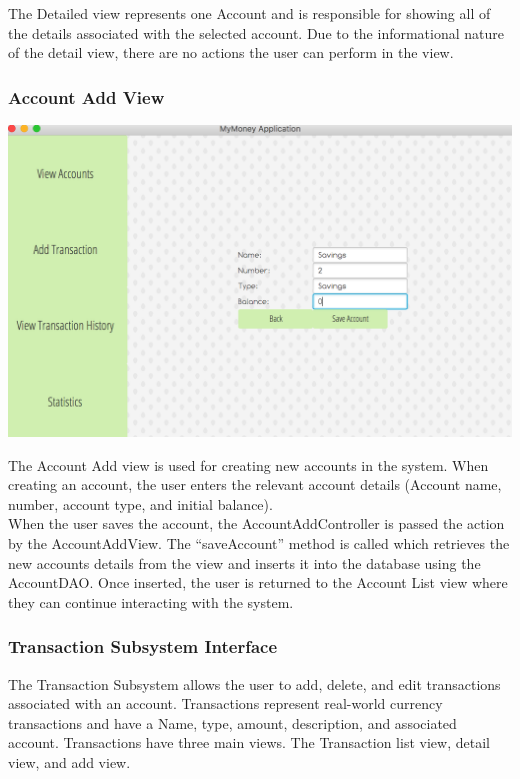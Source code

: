 \documentclass[12pt]{article}
\begin{document}
The Detailed view represents one Account and is responsible for
showing all of the details associated with the selected account. 
Due to the informational nature of the detail view, there are no actions
the user can perform in the view.

\subsubsection{Account Add View}

\includegraphics[scale=0.2]{accountadd}

The Account Add view is used for creating new accounts in the system.
When creating an account, the user enters the relevant account details
(Account name, number, account type, and initial balance).\\

When the user saves the account, the AccountAddController is passed the
action by the AccountAddView. The ``saveAccount'' method is called
which retrieves the new accounts details from the view and inserts it into the
database using the AccountDAO. Once inserted, the user is returned to the
Account List view where they can continue interacting with the system.

\subsubsection{Transaction Subsystem Interface}

The Transaction Subsystem allows the user to add, delete, and edit
transactions associated with an account. Transactions represent real-world
currency transactions and have a Name, type, amount, description, and 
associated account. Transactions have three main views. The Transaction list view,
detail view, and add view.
\end{document}
